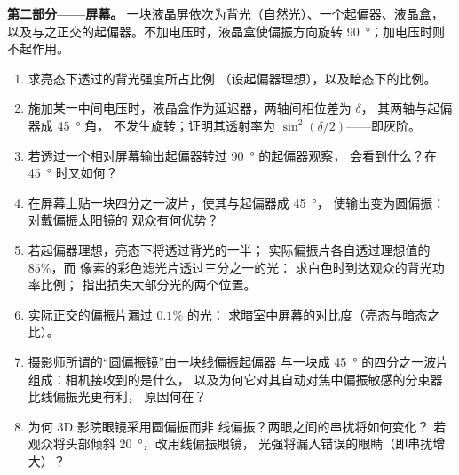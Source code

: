 \begin{problem}
\medskip
\noindent\textbf{第二部分——屏幕。}
一块液晶屏依次为背光（自然光）、一个起偏器、液晶盒，
以及与之正交的起偏器。不加电压时，液晶盒使偏振方向旋转
\qty{90}{\degree}；加电压时则不起作用。
\begin{enumerate}[resume]
  \item 求亮态下透过的背光强度所占比例
        （设起偏器理想），以及暗态下的比例。
  \item 施加某一中间电压时，液晶盒作为延迟器，两轴间相位差为 $\delta$，
        其两轴与起偏器成 \qty{45}{\degree} 角，
        不发生旋转；证明其透射率为
        $\sin^2(\delta/2)$——即灰阶。
  \item 若透过一个相对屏幕输出起偏器转过 \qty{90}{\degree} 的起偏器观察，
        会看到什么？在 \qty{45}{\degree} 时又如何？
  \item 在屏幕上贴一块四分之一波片，使其与起偏器成 \qty{45}{\degree}，
        使输出变为圆偏振：对戴偏振太阳镜的
        观众有何优势？
  \item 若起偏器理想，亮态下将透过背光的一半；
        实际偏振片各自透过理想值的 $85\%$，而
        像素的彩色滤光片透过三分之一的光：
        求白色时到达观众的背光功率比例；
        指出损失大部分光的两个位置。
  \item 实际正交的偏振片漏过 $0.1\%$ 的光：
        求暗室中屏幕的对比度（亮态与暗态之比）。
  \item 摄影师所谓的“圆偏振镜”由一块线偏振起偏器
        与一块成 \qty{45}{\degree} 的四分之一波片组成：相机接收到的是什么，
        以及为何它对其自动对焦中偏振敏感的分束器
        比线偏振光更有利，
        原因何在？
  \item 为何 3D 影院眼镜采用圆偏振而非
        线偏振？两眼之间的串扰将如何变化？
        若观众将头部倾斜 \qty{20}{\degree}，改用线偏振眼镜，
        光强将漏入错误的眼睛（即串扰增大）？
\end{enumerate}


\end{problem}
